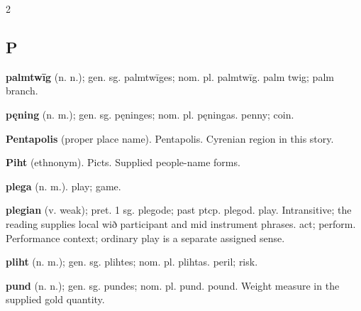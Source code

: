 \begin{multicols*}{2}
\subsection*{P}
\textbf{palmtwīg} (n. n.); gen. sg. palmtwīges; nom. pl. palmtwīg. palm twig; palm branch.\par
\textbf{pęning} (n. m.); gen. sg. pęninges; nom. pl. pęningas. penny; coin.\par
\textbf{Pentapolis} (proper place name). Pentapolis. Cyrenian region in this story.\par
\textbf{Piht} (ethnonym). Picts. Supplied people-name forms.\par
\textbf{plega} (n. m.). play; game.\par
\textbf{plegian} (v. weak); pret. 1 sg. plegode; past ptcp. plegod. play. Intransitive; the reading supplies local wið participant and mid instrument phrases. act; perform. Performance context; ordinary play is a separate assigned sense.\par
\textbf{pliht} (n. m.); gen. sg. plihtes; nom. pl. plihtas. peril; risk.\par
\textbf{pund} (n. n.); gen. sg. pundes; nom. pl. pund. pound. Weight measure in the supplied gold quantity.\par

\end{multicols*}
